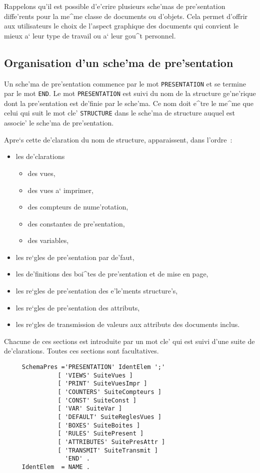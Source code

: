 {Rappelons qu'il est possible d'e'crire plusieurs sche'mas de pre'sentation
diffe'rents pour la me^me classe de documents ou d'objets. Cela permet
d'offrir aux utilisateurs le choix de l'aspect graphique des documents
qui convient le mieux a` leur type de travail ou a` leur gou^t personnel.

\subsection{Organisation d'un sche'ma de pre'sentation}

Un sche'ma de pre'sentation commence par le mot {\tt PRESENTATION} et se
termine par le mot {\tt END}. Le mot {\tt PRESENTATION} est suivi du nom
de la structure ge'ne'rique dont la pre'sentation est de'finie par le sche'ma.
Ce nom doit e^tre le me^me que celui qui suit le mot cle'
{\tt STRUCTURE} dans le sche'ma de structure auquel est associe' le
sche'ma de pre'sentation.

Apre`s cette de'claration du nom de structure, apparaissent, dans l'ordre~:

\begin{itemize}
\item
les de'clarations
   \begin{itemize}
   \item
   des vues,
   \item
   des vues a` imprimer,
   \item
   des compteurs de nume'rotation,
   \item
   des constantes de pre'sentation,
   \item
   des variables,
   \end{itemize}
\item
les re`gles de pre'sentation par de'faut,
\item
les de'finitions des boi^tes de pre'sentation et de mise en page,
\item
les re`gles de pre'sentation des e'le'ments structure's,
\item
les re`gles de pre'sentation des attributs,
\item
les re`gles de transmission de valeurs aux attributs des documents inclus.
\end{itemize}

Chacune de ces sections est introduite par un mot cle' qui est suivi
d'une suite de de'clarations. Toutes ces sections sont facultatives.

\begin{verbatim}
     SchemaPres ='PRESENTATION' IdentElem ';'
               [ 'VIEWS' SuiteVues ]
               [ 'PRINT' SuiteVuesImpr ]
               [ 'COUNTERS' SuiteCompteurs ]
               [ 'CONST' SuiteConst ]
               [ 'VAR' SuiteVar ]
               [ 'DEFAULT' SuiteReglesVues ]
               [ 'BOXES' SuiteBoites ]
               [ 'RULES' SuitePresent ]
               [ 'ATTRIBUTES' SuitePresAttr ]
               [ 'TRANSMIT' SuiteTransmit ]
                 'END' .
     IdentElem  = NAME .
\end{verbatim}

}
